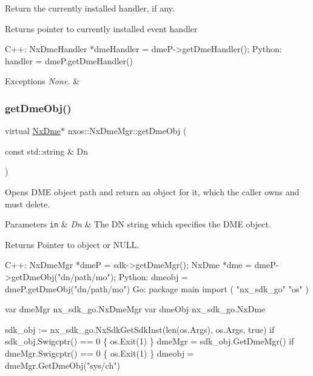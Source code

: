 Return the currently installed handler, if any. \begin{DoxyReturn}{Returns}
pointer to currently installed event handler 
\begin{DoxyCode}
C++:
   NxDmeHandler *dmeHandler = dmeP->getDmeHandler();
Python:
   handler = dmeP.getDmeHandler()
\end{DoxyCode}

\end{DoxyReturn}

\begin{DoxyExceptions}{Exceptions}
{\em None.} & \\
\hline
\end{DoxyExceptions}
\mbox{\label{classnxos_1_1_nx_dme_mgr_a15e7bdf416b3e17005327e556ad954e8}} 
\subsubsection{\texorpdfstring{get\+Dme\+Obj()}{getDmeObj()}}
{\footnotesize\ttfamily virtual \mbox{\hyperlink{classnxos_1_1_nx_dme}{Nx\+Dme}}$\ast$ nxos\+::\+Nx\+Dme\+Mgr\+::get\+Dme\+Obj (\begin{DoxyParamCaption}\item[{const std\+::string \&}]{Dn }\end{DoxyParamCaption})\hspace{0.3cm}{\ttfamily [pure virtual]}}

Opens D\+ME object path and return an object for it, which the caller owns and must delete. 
\begin{DoxyParams}[1]{Parameters}
\mbox{\tt in}  & {\em Dn} & The DN string which specifies the D\+ME object. \\
\hline
\end{DoxyParams}
\begin{DoxyReturn}{Returns}
Pointer to object or N\+U\+LL. 
\begin{DoxyCode}
C++:
     NxDmeMgr       *dmeP =  sdk->getDmeMgr();
     NxDme *dme = dmeP->getDmeObj(\textcolor{stringliteral}{"dn/path/mo"});
Python:
     dmeobj = dmeP.getDmeObj(\textcolor{stringliteral}{"dn/path/mo"})
Go:
     \textcolor{keyword}{package }main
     import (
        "nx\_sdk\_go"
        "os"
     )

     var dmeMgr  nx\_sdk\_go.NxDmeMgr
     var dmeObj  nx\_sdk\_go.NxDme

     sdk\_obj := nx\_sdk\_go.NxSdkGetSdkInst(len(os.Args), os.Args, true)
     if sdk\_obj.Swigcptr() == 0 \{
        os.Exit(1)
     \}
     dmeMgr = sdk\_obj.GetDmeMgr()
     if dmeMgr.Swigcptr() == 0 \{
        os.Exit(1)
     \}
     dmeobj = dmeMgr.GetDmeObj("sys/ch")
\end{DoxyCode}

\end{DoxyReturn}


